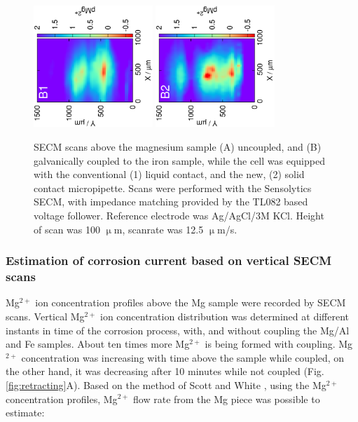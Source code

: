 \begin{figure}
\includegraphics[trim = 10mm 40mm 0mm 40mm, clip, width=0.4\textwidth, angle=-90]{img/mg_metal/liquid_coupled.eps} \includegraphics[trim = 10mm 40mm 0mm 40mm, clip, width=0.4\textwidth, angle=-90]{img/mg_metal/solid_coupled.eps}
\caption[SECM scans above the magnesium sample with the solid- and liquid contact magnesium ion-selective micropipettes.]{SECM scans above the magnesium sample (A) uncoupled, and (B) galvanically coupled to the iron sample, while the cell was equipped with the conventional (1) liquid contact, and the new, (2) solid contact micropipette.
Scans were performed with the Sensolytics SECM, with impedance matching provided by the TL082 based voltage follower.
Reference electrode was Ag/AgCl/3M KCl.
Height of scan was 100 $\upmu$m, scanrate was 12.5 $\upmu$m/s.}
\label{fig:solid_liquid_corrosion}
\end{figure}

			\subsubsection{Estimation of corrosion current based on vertical SECM scans}
Mg$^{2+}$ ion concentration profiles above the Mg sample were recorded by SECM scans.
Vertical Mg$^{2+}$ ion concentration distribution was determined at different instants in time of the corrosion process, with, and without coupling the Mg/Al and Fe samples.
About ten times more Mg$^{2+}$ is being formed with coupling.
Mg$^{2+}$ concentration was increasing with time above the sample while coupled, on the other hand, it was decreasing after 10 minutes while not coupled (Fig. \ref{fig:retracting}A).
Based on the method of Scott and White \cite{scott1993iontophoretic}, using the Mg$^{2+}$ concentration profiles, Mg$^{2+}$ flow rate from the Mg piece was possible to estimate:

